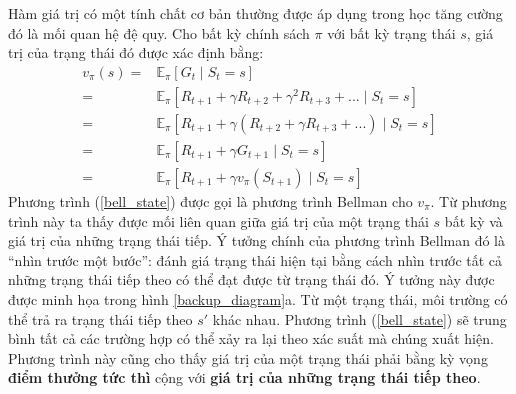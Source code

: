 Hàm giá trị có một tính chất cơ bản thường được áp dụng trong học tăng cường đó là mối quan hệ đệ quy. Cho bất kỳ chính sách $\pi$ với bất kỳ trạng thái $s$, giá trị của trạng thái đó được xác định bằng:	
\begin{align}
\label{bell_state}
v_{\pi}(s) = {}& \mathbb{E}_{\pi}\left [\mathit{G}_t \mid \mathit{S}_{t} = s\right ] \nonumber \\
= {}& \mathbb{E}_{\pi}\left [ \mathit{R}_{t+1} + \gamma \mathit{R}_{t+2} + \gamma^{2} \mathit{R}_{t+3} + ... \mid \mathit{S}_t = s  \right ] \nonumber \\
= {}& \mathbb{E}_{\pi}\left [ \mathit{R}_{t+1} + \gamma( {R}_{t+2} + \gamma \mathit{R}_{t+3} + ...) \mid \mathit{S}_t = s  \right ] \nonumber \\
= {}& \mathbb{E}_{\pi}\left [ \mathit{R}_{t+1} + \gamma\mathit{G}_{t + 1} \mid \mathit{S}_t = s  \right ] \nonumber \\
= {}& \mathbb{E}_{\pi}\left [ \mathit{R}_{t+1} + \gamma v_{\pi}(\mathit{S}_{t+1}) \mid \mathit{S}_t = s  \right ]
\end{align}	
Phương trình (\ref{bell_state}) được gọi là phương trình Bellman cho $v_{\pi}$. 
Từ phương trình này ta thấy được mối liên quan giữa giá trị của một trạng thái $s$ bất kỳ và giá trị của những trạng thái tiếp. 
Ý tưởng chính của phương trình Bellman đó là ``nhìn trước một bước'': đánh giá trạng thái hiện tại bằng cách nhìn trước tất cả những trạng thái tiếp theo có thể đạt được từ trạng thái đó.
Ý tưởng này được được minh họa trong hình \ref{backup_diagram}a. 
Từ một trạng thái, môi trường có thể trả ra trạng thái tiếp theo $s'$ khác nhau. 
Phương trình (\ref{bell_state}) sẽ trung bình tất cả các trường hợp có thể xảy ra lại theo xác suất mà chúng xuất hiện. 
Phương trình này cũng cho thấy giá trị của một trạng thái phải bằng kỳ vọng \textbf{điểm thưởng tức thì} cộng với \textbf{giá trị của những trạng thái tiếp theo}.

